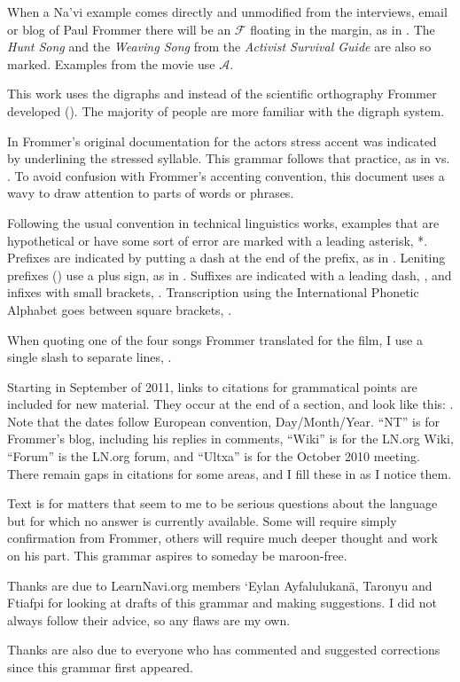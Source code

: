 When a Na'vi example comes directly and unmodified from the
interviews, email or blog of Paul Frommer there will be an
$\mathcal{F}$ floating in the margin, as in .  The
\textit{Hunt Song} and the \textit{Weaving Song} from the
\textit{Activist Survival Guide} are also so marked.  Examples from
the movie use $\mathcal{A}$.

This work uses the digraphs  and  instead of the
scientific orthography Frommer developed ().  The
majority of people are more familiar with the digraph system.

In Frommer's original documentation for the actors stress accent was
indicated by underlining the stressed syllable.  This grammar follows
that practice, as in   vs. 
.  To avoid confusion with Frommer's accenting convention,
this document uses a wavy  to draw attention to parts
of words or phrases.

Following the usual convention in technical linguistics works,
examples that are hypothetical or have some sort of error are marked
with a leading asterisk, *.  Prefixes are indicated by
putting a dash at the end of the prefix, as in .  Leniting
prefixes () use a plus sign, as in .
Suffixes are indicated with a leading dash, , and infixes with
small brackets, .  Transcription using the International
Phonetic Alphabet goes between square brackets, {\gplus [fɪ.ˈfja]}.

When quoting one of the four songs Frommer translated for the film, I
use a single slash to separate lines, .

Starting in September of 2011, links to citations for grammatical
points are included for new material.  They occur at the end of a
section, and look like this:
.
Note that the dates follow European convention, Day/Month/Year.
``NT'' is for Frommer's blog, including his replies in comments,
``Wiki'' is for the LN.org Wiki, ``Forum'' is the LN.org forum, and
``Ultxa'' is for the October 2010 meeting.  There remain gaps in
citations for some areas, and I fill these in as I notice them.

Text  is for matters that seem to me to be serious
questions about the language but for which no answer is currently
available.  Some will require simply confirmation from Frommer, others
will require much deeper thought and work on his part.  This grammar
aspires to someday be maroon-free.

\bigskip

\bigskip
Thanks are due to LearnNavi.org members `Eylan Ayfalulukanä, Taronyu
and Ftiafpi for looking at drafts of this grammar and making
suggestions.  I did not always follow their advice, so any flaws are
my own.

Thanks are also due to everyone who has commented and suggested
corrections since this grammar first appeared.

\bigskip
